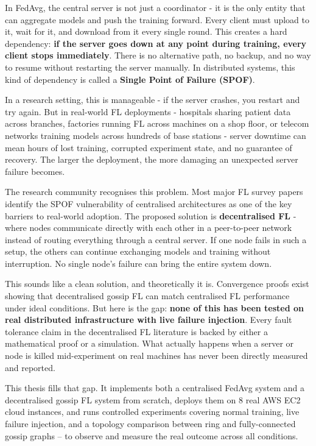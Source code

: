 \documentclass[12pt]{report}
\begin{document}
In FedAvg, the central server is not just a coordinator - it is the only entity
that can aggregate models and push the training forward. Every client must upload
to it, wait for it, and download from it every single round. This creates a hard
dependency: \textbf{if the server goes down at any point during training, every
client stops immediately}. There is no alternative path, no backup, and no way to
resume without restarting the server manually. In distributed systems, this kind of
dependency is called a \textbf{Single Point of Failure (SPOF)}.

In a research setting, this is manageable - if the server crashes, you restart
and try again. But in real-world FL deployments - hospitals sharing patient data
across branches, factories running FL across machines on a shop floor, or telecom
networks training models across hundreds of base stations - server downtime can
mean hours of lost training, corrupted experiment state, and no guarantee of
recovery. The larger the deployment, the more damaging an unexpected server failure
becomes.

The research community recognises this problem. Most major FL survey papers identify
the SPOF vulnerability of centralised architectures as one of the key barriers to
real-world adoption. The proposed solution is \textbf{decentralised FL} - where
nodes communicate directly with each other in a peer-to-peer network instead of
routing everything through a central server. If one node fails in such a setup,
the others can continue exchanging models and training without interruption. No
single node's failure can bring the entire system down.

This sounds like a clean solution, and theoretically it is. Convergence proofs
exist showing that decentralised gossip FL can match centralised FL performance
under ideal conditions. But here is the gap: \textbf{none of this has been tested
on real distributed infrastructure with live failure injection}. Every fault
tolerance claim in the decentralised FL literature is backed by either a
mathematical proof or a simulation. What actually happens when a server or node
is killed mid-experiment on real machines has never been directly measured and
reported.

This thesis fills that gap. It implements both a centralised FedAvg system and a
decentralised gossip FL system from scratch, deploys them on 8 real AWS EC2 cloud
instances, and runs controlled experiments covering normal training, live failure
injection, and a topology comparison between ring and fully-connected gossip graphs
-- to observe and measure the real outcome across all conditions.
\end{document}
